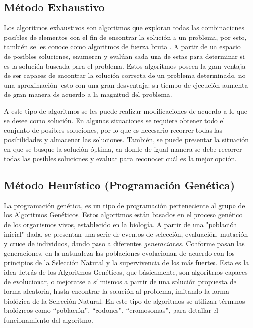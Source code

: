 \subsection{Método Exhaustivo}
Los algoritmos exhaustivos son algoritmos que exploran todas las combinaciones posibles de elementos con el fin de encontrar la solución a un problema, por esto, también se les conoce como algoritmos de fuerza bruta \cite{R10}. A partir de un espacio de posibles soluciones, enumeran y evalúan cada una de estas para determinar si es la solución buscada para el problema. Estos algoritmos poseen la gran ventaja de ser capaces de encontrar la solución correcta de un problema determinado, no una aproximación; esto con una gran desventaja: su tiempo de ejecución aumenta de gran manera de acuerdo a la magnitud del problema. 


A este tipo de algoritmos se les puede realizar modificaciones de acuerdo a lo que se desee como solución. En algunas situaciones se requiere obtener todo el conjunto de posibles soluciones, por lo que es necesario recorrer todas las posibilidades y almacenar las soluciones. También, se puede presentar la situación en que se busque la solución óptima, en donde de igual manera se debe recorrer todas las posibles soluciones y evaluar para reconocer cuál es la mejor opción.   

\subsection{Método Heurístico (Programación Genética)}

 La programación genética, es un tipo de programación perteneciente al grupo de los Algoritmos Genéticos. Estos algoritmos están basados en el proceso genético de los organismos vivos, establecido en la biología. A partir de una "población inicial" dada, se presentan una serie de eventos de selección, evaluación, mutación y cruce de individuos, dando paso a diferentes \emph{generaciones}. Conforme pasan las generaciones, en la naturaleza las poblaciones evolucionan de acuerdo con los principios de la Selección Natural y la supervivencia de los más fuertes. Esta es la idea detrás de los Algoritmos Genéticos, que básicamente, son algoritmos capaces de evolucionar, o mejorarse a sí mismos a partir de una solución propuesta de forma aleatoria, hasta encontrar la solución al problema, imitando la forma biológica de la Selección Natural. En este tipo de algoritmos se utilizan términos biológicos como ``población'', ``codones'', ``cromosomas'', para detallar el funcionamiento del algoritmo\cite{R12}.


